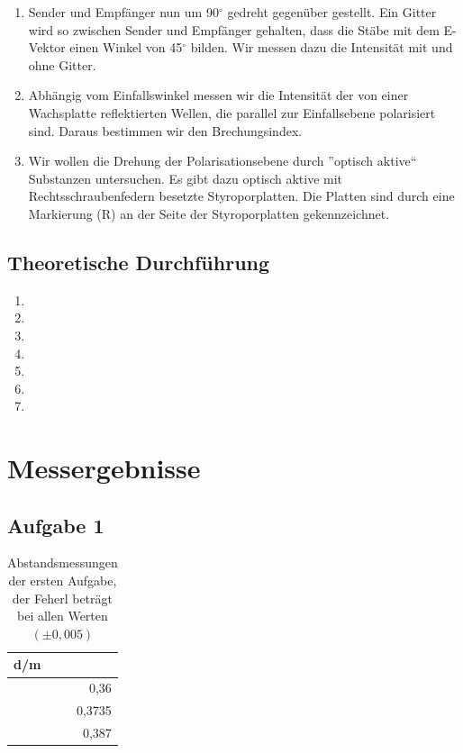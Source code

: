 \documentclass[12pt]{scrartcl}
\begin{document}
\begin{enumerate}
\item Sender und Empfänger nun um 90$^{\circ}$ gedreht gegenüber gestellt. Ein Gitter wird so zwischen Sender und Empfänger gehalten, dass die Stäbe mit dem E-Vektor einen Winkel von 45$^{\circ}$ bilden. Wir messen dazu die Intensität mit und ohne Gitter.

\item Abhängig vom Einfallswinkel messen wir die Intensität der von einer Wachsplatte reflektierten Wellen, die parallel zur Einfallsebene polarisiert sind. Daraus bestimmen wir den Brechungsindex.

\item Wir wollen die Drehung der Polarisationsebene durch ”optisch aktive“ Substanzen untersuchen. Es gibt dazu optisch aktive mit Rechtsschraubenfedern besetzte Styroporplatten. Die Platten sind durch eine Markierung (R) an der Seite der Styroporplatten gekennzeichnet.
\end{enumerate}

\subsection{Theoretische Durchführung}

\begin{enumerate}
\item
\item
\item
\item
\item
\item
\item
\end{enumerate}

\section{Messergebnisse}

\subsection{Aufgabe 1}
\begin{table}[H]
\caption{Abstandsmessungen der ersten Aufgabe, der Feherl beträgt bei allen Werten $(\pm 0,005)$}
\begin{tabular}{|r|}
\hline
\multicolumn{1}{|l|}{d/m} \\ \hline
0,36 \\ \hline
0,3735 \\ \hline
0,387 \\ \hline
\end{tabular}
\label{tab:a_1}
\end{table}
\end{document}
